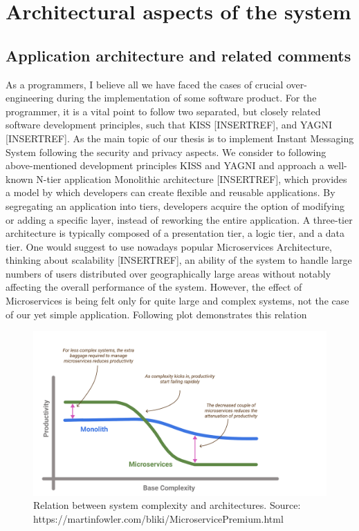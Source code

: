\chapter{Architectural aspects of the system}\label{ch:architectural-aspects-of-the-system}


\section{Application architecture and related comments}\label{sec:application-architecture-and-related-comments}

As a programmers, I believe all we have faced the cases of crucial over-engineering during the implementation of some
software product.
For the programmer, it is a vital point to follow two separated, but closely related software development principles,
such that KISS [INSERTREF], and YAGNI [INSERTREF].
As the main topic of our thesis is to implement Instant Messaging System following the security and privacy aspects.
We consider to following above-mentioned development principles KISS and YAGNI and approach
a well-known N-tier application Monolithic architecture [INSERTREF], which provides a model by which developers can
create flexible and reusable applications.
By segregating an application into tiers, developers acquire the option of modifying or adding a specific layer,
instead of reworking the entire application.
A three-tier architecture is typically composed of a presentation tier, a logic tier, and a data tier.
One would suggest to use nowadays popular Microservices Architecture, thinking about scalability [INSERTREF],
an ability of the system to handle large numbers of users distributed over geographically large areas without
notably affecting the overall performance of the system.
However, the effect of Microservices is being felt only for quite large and complex systems,
not the case of our yet simple application.
Following plot demonstrates this relation

\begin{figure}[H]
    \centering
    \includegraphics[width=1\textwidth]{Pictures/Monolith_vs_Microservice.pdf}
    \caption{Relation between system complexity and architectures. Source: https://martinfowler.com/bliki/MicroservicePremium.html}
    \label{fig:monolith_vs_microservice}
\end{figure}


